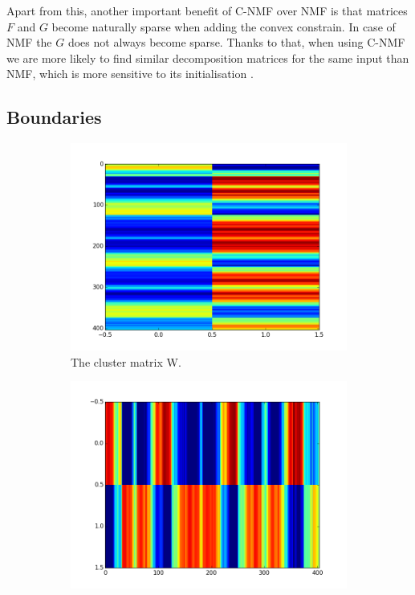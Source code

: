 Apart from this, another important benefit of C-NMF over NMF is that matrices $F$ and $G$ become naturally sparse when adding the convex constrain. In case of NMF the $G$ does not always become sparse. Thanks to that, when using C-NMF we are more likely to find similar decomposition matrices for the same input than NMF, which is more sensitive to its initialisation \cite{Nieto}. 

\vspace{10pt}


\subsection{Boundaries}

\begin{figure}
        \centering
        \begin{subfigure}[b]{0.47\textwidth}
                \includegraphics[width=\textwidth]{Figures/F}
                \caption{The cluster matrix W.}
                \label{fig:Wmatrix}
        \end{subfigure}%
        \begin{subfigure}[b]{0.47\textwidth}
                \includegraphics[width=\textwidth]{Figures/G}

\end{subfigure}
\end{figure}
